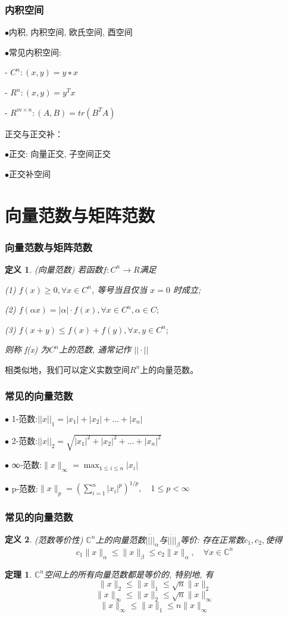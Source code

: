 \documentclass[notheorems,serif]{beamer}
\newcommand{\hei}[1]{{\HEI#1}}
\newtheorem{theorem}{\hei{定理}}
\newtheorem{definition}{\hei{定义}}
\begin{document}
\begin{frame}
\frametitle{内积空间}
\qquad$\bullet$内积, 内积空间, 欧氏空间, 酉空间
 
\qquad$\bullet$常见内积空间:
 
 \qquad\qquad - $C^{n} : (x, y) = y∗x$
 
 \qquad\qquad - $R^{n} : (x, y) = y^{T}x$
 
 \qquad\qquad - $R^{m×n} : (A, B) = tr(B^{T}A)$
 
 正交与正交补：
 
\qquad$\bullet$正交: 向量正交, 子空间正交
 
\qquad$\bullet$正交补空间
\end{frame}

\section{向量范数与矩阵范数}
\begin{frame}
\frametitle{向量范数与矩阵范数}
\begin{definition}(向量范数)
	若函数$f : C^n → R $满足
	
	(1) $f(x) ≥ 0, ∀ x ∈ C^n$, 等号当且仅当 $x = 0$ 时成立;
	
	(2) $f(αx) = |α| · f(x), ∀ x ∈ C^{n}, α ∈ C;$
	
	(3) $f(x + y) ≤ f(x) + f(y), ∀x, y ∈ C^{n};$
	
	则称 f(x) 为$C^{n}$上的范数, 通常记作 $||·||$
\end{definition}

相类似地，我们可以定义实数空间$R^n$上的向量范数。
\end{frame}

\begin{frame}

\frametitle{常见的向量范数}
$\bullet$ 1-范数:$||x||_1=|x_1|+|x_2|+...+|x_n|$

$\bullet$ 2-范数:$||x||_2=\sqrt{|x_1|^2+|x_2|^2+...+|x_n|^2}$

$\bullet$ ∞-范数:$\|x\|_{\infty}=\max _{1 \leq i \leq n}\left|x_{i}\right|$

$\bullet$ p-范数:$\|x\|_{p}=\left(\sum_{i=1}^{n}\left|x_{i}\right|^{p}\right)^{1 / p}, \quad 1 \leq p<\infty$
\end{frame}

\begin{frame}
\frametitle{常见的向量范数}
\begin{definition}(范数等价性)
	$\mathbb{C}^{n}$上的向量范数$||\dot||_{\alpha}$与$||\dot||_{\beta}$等价: 存在正常数$c_1, c_2,$使得
	$$c_{1}\|x\|_{\alpha} \leq\|x\|_{\beta} \leq c_{2}\|x\|_{\alpha}, \quad \forall x \in \mathbb{C}^{n}$$
\end{definition}

\begin{theorem}
	$\mathbb{C}^{n}$空间上的所有向量范数都是等价的, 特别地, 有
	$$
	\|x\|_{2} \leq\|x\|_{1} \leq \sqrt{n}\|x\|_{2}
	$$
	$$
	\|x\|_{\infty} \leq\|x\|_{2} \leq \sqrt{n}\|x\|_{\infty}
	$$
	$$
	\|x\|_{\infty} \leq\|x\|_{1} \leq n\|x\|_{\infty}
	$$
\end{theorem}
\end{frame}
\end{document}
